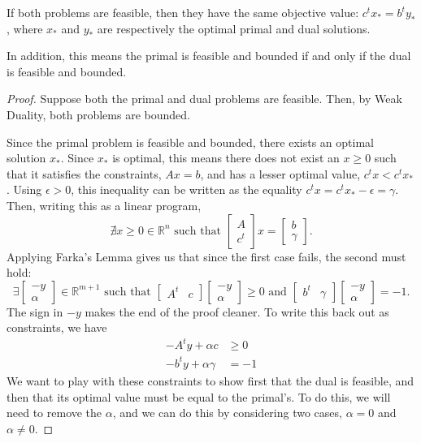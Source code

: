 \documentclass{article}
\newcommand\R{{\mathbb{R}}}
\begin{document}
\begin{theorem}
	If both problems are feasible, then they have the same objective value: $c^tx_* = b^ty_*$, where
	$x_*$ and $y_*$ are respectively the optimal primal and dual solutions.

	\noindent
	In addition, this means the primal is feasible and bounded if and only if the dual is feasible and
	bounded.
\end{theorem}
\begin{proof}
	Suppose both the primal and dual problems are feasible. Then, by Weak Duality, both problems are
	bounded.

	Since the primal problem is feasible and bounded, there exists an optimal solution $x_*$. Since
	$x_*$ is optimal, this means there does not exist an $x \ge 0$ such that it satisfies the
	constraints, $Ax = b$, and has a lesser optimal value, $c^tx < c^tx_*$. Using $\epsilon > 0$, this
	inequality can be written as the equality $c^tx = c^tx_* - \epsilon = \gamma$. Then, writing this
	as a linear program,
	\[
		\nexists x \ge 0 \in \R^n \text{ such that }
		\begin{bmatrix} A \\ c^t \end{bmatrix} x = \begin{bmatrix} b \\ \gamma \end{bmatrix}
		\text{.}
	\]
	Applying Farka's Lemma gives us that since the first case fails, the second must hold:
	\[
		\exists \begin{bmatrix} -y \\ \alpha \end{bmatrix} \in \R^{m + 1} \text{ such that }
		\begin{bmatrix} A^t & c \end{bmatrix} \begin{bmatrix} -y \\ \alpha \end{bmatrix} \ge 0
		\text{ and }
		\begin{bmatrix} b^t & \gamma \end{bmatrix}\begin{bmatrix} -y \\ \alpha \end{bmatrix} = -1
		\text{.}
	\]
	The sign in $-y$ makes the end of the proof cleaner. To write this back out as constraints, we have
	\begin{align*}
		-A^t y + \alpha c &\ge 0 \\
		-b^t y + \alpha \gamma &= - 1
	\end{align*}
	We want to play with these constraints to show first that the dual is feasible, and then that its
	optimal value must be equal to the primal's. To do this, we will need to remove the $\alpha$, and
	we can do this by considering two cases, $\alpha = 0$ and $\alpha \neq 0$.


\end{proof}
\end{document}
